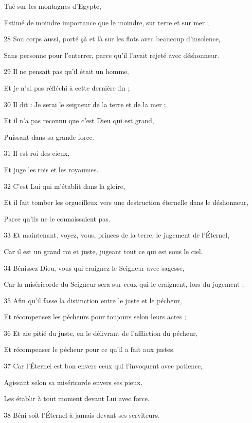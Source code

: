 \par     Tué sur les montagnes d'Egypte,
\par     Estimé de moindre importance que le moindre, sur terre et sur mer ;
\par 28 Son corps aussi, porté çà et là sur les flots avec beaucoup d'insolence,
\par     Sans personne pour l'enterrer, parce qu'il l'avait rejeté avec déshonneur.
\par 29 Il ne pensait pas qu'il était un homme,
\par     Et je n’ai pas réfléchi à cette dernière fin ;
\par 30 Il dit : Je serai le seigneur de la terre et de la mer ;
\par     Et il n'a pas reconnu que c'est Dieu qui est grand,
\par     Puissant dans sa grande force.
\par 31 Il est roi des cieux,
\par     Et juge les rois et les royaumes.
\par 32 C'est Lui qui m'établit dans la gloire,
\par     Et il fait tomber les orgueilleux vers une destruction éternelle dans le déshonneur,
\par     Parce qu’ils ne le connaissaient pas.
\par 33 Et maintenant, voyez, vous, princes de la terre, le jugement de l'Éternel,
\par     Car il est un grand roi et juste, jugeant tout ce qui est sous le ciel.
\par 34 Bénissez Dieu, vous qui craignez le Seigneur avec sagesse,
\par     Car la miséricorde du Seigneur sera sur ceux qui le craignent, lors du jugement ;
\par 35 Afin qu'il fasse la distinction entre le juste et le pécheur,
\par     Et récompensez les pécheurs pour toujours selon leurs actes ;
\par 36 Et aie pitié du juste, en le délivrant de l'affliction du pécheur,
\par     Et récompenser le pécheur pour ce qu'il a fait aux justes.
\par 37 Car l'Éternel est bon envers ceux qui l'invoquent avec patience,
\par     Agissant selon sa miséricorde envers ses pieux,
\par     Les établir à tout moment devant Lui avec force.
\par 38 Béni soit l'Éternel à jamais devant ses serviteurs.

